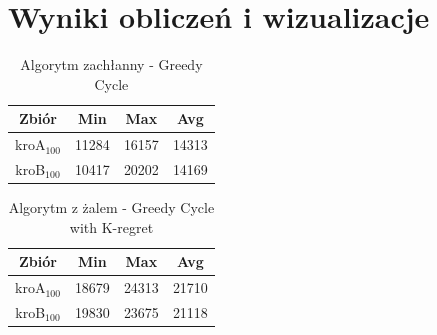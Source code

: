 \documentclass{article}
\begin{document}
\section{Wyniki obliczeń i wizualizacje}

\begin{table}[h!]
\centering
\begin{tabular}{ |c|c|c|c| } 
 \hline
 Zbiór & Min & Max & Avg \\ 
  \hline
 kroA$_{100}$ & 11284 & 16157 & 14313 \\ 
  \hline
 kroB$_{100}$ & 10417 & 20202 & 14169 \\ 
 \hline
\end{tabular}
\caption{Algorytm zachłanny - Greedy Cycle}
\end{table}

\begin{table}[h!]
\centering
\begin{tabular}{ |c|c|c|c| } 
 \hline
 Zbiór & Min & Max & Avg \\ 
  \hline
 kroA$_{100}$ & 18679 & 24313 & 21710 \\ 
  \hline
 kroB$_{100}$ & 19830 & 23675 & 21118 \\ 
 \hline
\end{tabular}
\caption{Algorytm z żalem - Greedy Cycle with K-regret}
\end{table}
\end{document}
